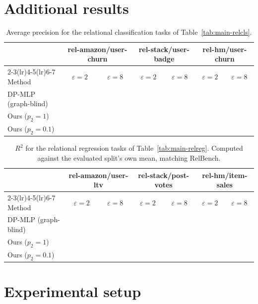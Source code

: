 \documentclass[11pt]{article}
\begin{document}
\appendix
\section{Additional results}

\begin{table}[H]
\centering\small
\caption{Average precision for the relational classification tasks of
Table~\ref{tab:main-relcls}.}
\label{tab:ap}
\begin{tabular}{lcccccc}
\toprule
& \multicolumn{2}{c}{rel-amazon/user-churn} & \multicolumn{2}{c}{rel-stack/user-badge}
& \multicolumn{2}{c}{rel-hm/user-churn}\\
\cmidrule(lr){2-3}\cmidrule(lr){4-5}\cmidrule(lr){6-7}
Method & $\varepsilon{=}2$ & $\varepsilon{=}8$ & $\varepsilon{=}2$ & $\varepsilon{=}8$
       & $\varepsilon{=}2$ & $\varepsilon{=}8$\\
\midrule
DP-MLP (graph-blind) & & & & & & \\
Ours ($p_2{=}1$)     & & & & & & \\
Ours ($p_2{=}0.1$)   & & & & & & \\
\bottomrule
\end{tabular}
\end{table}

\begin{table}[H]
\centering\small
\caption{$R^2$ for the relational regression tasks of
Table~\ref{tab:main-relreg}. Computed against the evaluated split's own mean,
matching RelBench.}
\label{tab:r2}
\begin{tabular}{lcccccc}
\toprule
& \multicolumn{2}{c}{rel-amazon/user-ltv} & \multicolumn{2}{c}{rel-stack/post-votes}
& \multicolumn{2}{c}{rel-hm/item-sales}\\
\cmidrule(lr){2-3}\cmidrule(lr){4-5}\cmidrule(lr){6-7}
Method & $\varepsilon{=}2$ & $\varepsilon{=}8$ & $\varepsilon{=}2$ & $\varepsilon{=}8$
       & $\varepsilon{=}2$ & $\varepsilon{=}8$\\
\midrule
DP-MLP (graph-blind) & & & & & & \\
Ours ($p_2{=}1$)     & & & & & & \\
Ours ($p_2{=}0.1$)   & & & & & & \\
\bottomrule
\end{tabular}
\end{table}

\section{Experimental setup}
\end{document}
